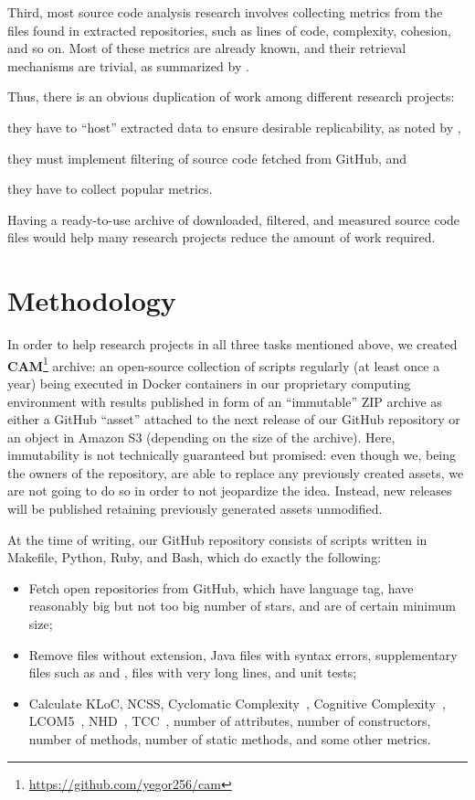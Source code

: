 \documentclass[11pt,sigplan,nonacm]{acmart}
\newcommand\cam{{\sffamily\bfseries CAM}}
\begin{document}
Third, most source code analysis research involves collecting metrics from the files found in extracted repositories, such as lines of code, complexity, cohesion, and so on. Most of these metrics are already known, and their retrieval mechanisms are trivial, as summarized by \citet{nunez2017source}.

Thus, there is an obvious duplication of work among different research projects:
\begin{inparaenum}[(a)]
\item they have to ``host'' extracted data to ensure desirable replicability, as noted by \citet{7887704},
\item they must implement filtering of source code fetched from GitHub, and
\item they have to collect popular metrics.
\end{inparaenum}
Having a ready-to-use archive of downloaded, filtered, and measured source code files would help many research projects reduce the amount of work required.

\section{Methodology}

In order to help research projects in all three tasks mentioned above, we created \cam{}\footnote{\url{https://github.com/yegor256/cam}} archive: an open-source collection of scripts regularly (at least once a year) being executed in Docker containers in our proprietary computing environment with results published in form of an ``immutable'' ZIP archive as either a GitHub ``asset'' attached to the next release of our GitHub repository or an object in Amazon S3 (depending on the size of the archive). Here, immutability is not technically guaranteed but promised: even though we, being the owners of the repository, are able to replace any previously created assets, we are not going to do so in order to not jeopardize the idea. Instead, new releases will be published retaining previously generated assets unmodified.

At the time of writing, our GitHub repository consists of scripts written in Makefile,
Python, Ruby, and Bash, which do exactly the following:
\begin{itemize}
    \item Fetch open repositories from GitHub, which have  language
    tag, have reasonably big but not too big number of stars, and are
    of certain minimum size;
    \item Remove files without  extension, Java files with syntax errors,
    supplementary files such as  and ,
    files with very long lines, and unit tests;
    \item Calculate KLoC, NCSS, Cyclomatic Complexity~\citep{mccabe1976complexity},
    Cognitive Complexity~\citep{campbell2018cognitive}, LCOM5~\citep{henderson1996coupling},
    NHD~\citep{counsell2006interpretation}, TCC~\citep{bieman1995cohesion},
    number of attributes, number of constructors, number of methods, number of static methods,
    and some other metrics.
\end{itemize}
\end{document}
